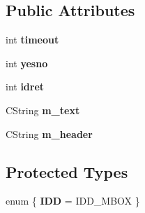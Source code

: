 \subsection*{Public Attributes}
\begin{DoxyCompactItemize}
\item 
\hypertarget{class_c_msg_box_a4d5019da39147ae62070df85acd00d51}{int {\bfseries timeout}}\label{class_c_msg_box_a4d5019da39147ae62070df85acd00d51}

\item 
\hypertarget{class_c_msg_box_acd9df774d12b6a30b92c69d9811d0a25}{int {\bfseries yesno}}\label{class_c_msg_box_acd9df774d12b6a30b92c69d9811d0a25}

\item 
\hypertarget{class_c_msg_box_a689e560dd4421bf1168d350fa68ef761}{int {\bfseries idret}}\label{class_c_msg_box_a689e560dd4421bf1168d350fa68ef761}

\item 
\hypertarget{class_c_msg_box_a0e4faa38d27a3aaf74638b4884c14633}{C\-String {\bfseries m\-\_\-text}}\label{class_c_msg_box_a0e4faa38d27a3aaf74638b4884c14633}

\item 
\hypertarget{class_c_msg_box_a828b2d0f6eafcc50ac0a1bbee6046f94}{C\-String {\bfseries m\-\_\-header}}\label{class_c_msg_box_a828b2d0f6eafcc50ac0a1bbee6046f94}

\end{DoxyCompactItemize}
\subsection*{Protected Types}
\begin{DoxyCompactItemize}
\item 
enum \{ {\bfseries I\-D\-D} =  I\-D\-D\-\_\-\-M\-B\-O\-X
 \}
\end{DoxyCompactItemize}
